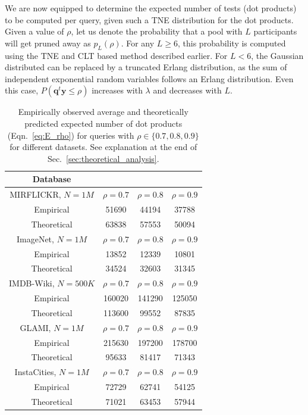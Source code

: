 \documentclass[sigconf, anonymous, review]{acmart}
\begin{document}
We are now equipped to determine the expected number of tests (dot products) to be computed per query, given such a TNE distribution for the dot products. Given a value of $\rho$, let us denote the probability that a pool with $L$ participants will get pruned away as $p_L(\rho)$. For any $L \geq 6$, this probability is computed using the TNE and CLT based method described earlier. For $L < 6$, the Gaussian distributed can be replaced by a truncated Erlang distribution, as the sum of independent exponential random variables follows an Erlang distribution. Even this case, $P(\boldsymbol{q}^t \boldsymbol{y} \leq \rho)$ increases with $\lambda$ and decreases with $L$. 

\begin{table}
\centering
\begin{tabular}{ |c|c|c|c| } 
 \hline
 \rowcolor{Gray}
Database & & &\\\hline
 \rowcolor{Gray}
\textsf{MIRFLICKR}, $N=1M$ & $\rho = 0.7$ & $\rho = 0.8$ & $\rho = 0.9$\\\hline
Empirical & 51690 &	44194 &	37788 \\
Theoretical &	63838 & 	57553	& 50094 \\ \hline
 \rowcolor{Gray}
\textsf{ImageNet}, $N = 1M$ & $\rho = 0.7$ & $\rho = 0.8$ & $\rho = 0.9$\\\hline
Empirical &	13852	& 12339 & 	10801\\ 
Theoretical	& 34524	& 32603	& 31345\\\hline
 \rowcolor{Gray}
\textsf{IMDB-Wiki}, $N = 500K$ & $\rho = 0.7$ & $\rho = 0.8$ & $\rho = 0.9$\\\hline			
Empirical &	160020 &	141290 &	125050\\
Theoretical &	113600 &	99552	& 87835\\\hline
 \rowcolor{Gray}
\textsf{GLAMI}, $N = 1M$ & $\rho = 0.7$ & $\rho = 0.8$ & $\rho = 0.9$\\\hline	
Empirical &	215630 &	197200 &	178700\\
Theoretical &	95633 &	81417 &	71343\\\hline		
 \rowcolor{Gray}
\textsf{InstaCities}, $N = 1M$	& $\rho = 0.7$ & $\rho = 0.8$ & $\rho = 0.9$\\\hline
Empirical &	72729 &	62741	& 54125\\
Theoretical &	71021 & 	63453 &	57944\\\hline
\end{tabular}
\caption{Empirically observed average and theoretically predicted expected number of dot products (Eqn.~\ref{eq:E_rho}) for queries with $\rho \in \{0.7,0.8,0.9\}$ for different datasets. See explanation at the end of Sec.~\ref{sec:theoretical_analysis}.}
\label{tab:emp_theor}
\end{table}
\end{document}
